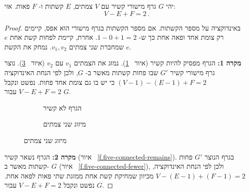 \begin{theorem}[אוילר]\label{thm.euler}
יהי
$G$
גרף מישורי קשיר עם
$V$
צמתים,
$E$
קשתות ו-%
$F$
פאות. אזי:
\[
V-E+F=2\,.
\]
\end{theorem}
\begin{proof}
באינדוקציה על מספר הקשתות. אם מספר הקשתות בגרף מישורי הוא אפס, קיימים רק צומת אחד ופאה אחת כך ש-%
$1-0+1=2$.
אחרת, קיימת לפחות קשת אחת
$e$
שמחברת שני צמתים
$v_1,v_2$.
נמחק את הקשת
$e$.

\textbf{מקרה 1:}
הגרף מפסיק להיות קשיר
(איור~
\ref{f.five-disconnected-removing}).
נמזג את הצמתים
$v_1$
עם
$v_2$
(איור~
\ref{f.five-disconnected-merge}).
נוצר גרף מישורי קשיר
$G'$
 שבו פחות קשתות מאשר ב-%
$G$,
ולכן לפי הנחת האינדוקציה
$(V-1)-(E-1)+F=2$
כי יש בו גם צומת אחד פחות. נפשט ונקבל
$V-E+F=2$
עבור
$G$.

\begin{figure}[tb]
\begin{center}
\begin{subfigure}{.4\textwidth}\centering
{}
\caption{הגרף לא קשיר}\label{f.five-disconnected-removing}
\end{subfigure}
\hspace{3em}
\begin{subfigure}{.4\textwidth}\centering
{}
\caption{מיזוג שני צמתים}\label{f.five-disconnected-merge}
\end{subfigure}
\end{center}
\end{figure}

\textbf{מקרה 2:}
הגרף נשאר קשיר
(איור~
\ref{f.five-connected-remains}).
בגרף הנוצר
$G'$
פחות קשתות מאשר ב-%
$G$
(איור~
\ref{f.five-connected-fewer}),
ולכן לפי הנחת האינדוקציה,
$V-(E-1)+(F-1)=2$
מכיוון שמחיקת קשת אחת ממזגת שתי פאות לפאה אחת. נפשט ונקבל
$V-E+F=2$ 
עבור
$G$.
\end{proof}

